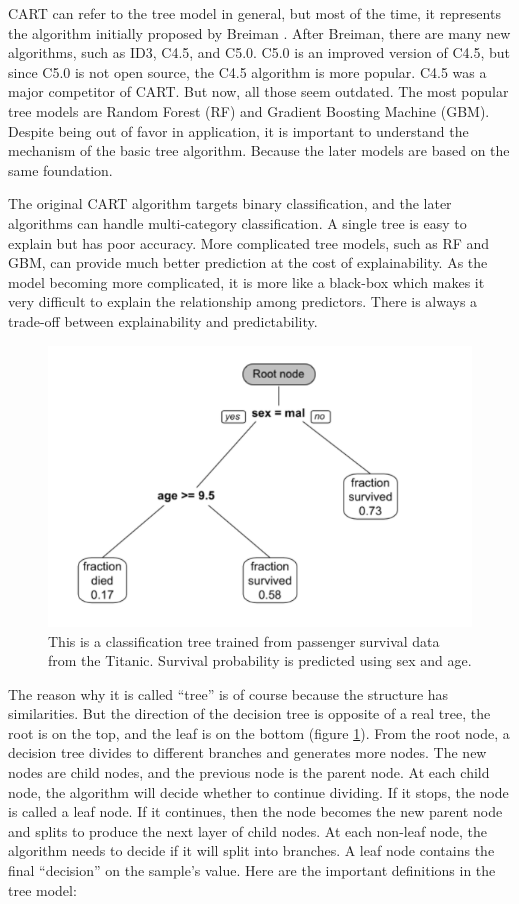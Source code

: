 \documentclass[12pt,]{krantz}
\begin{document}
CART can refer to the tree model in general, but most of the time, it represents the algorithm initially proposed by Breiman \citep{Breiman1984}. After Breiman, there are many new algorithms, such as ID3, C4.5, and C5.0. C5.0 is an improved version of C4.5, but since C5.0 is not open source, the C4.5 algorithm is more popular. C4.5 was a major competitor of CART. But now, all those seem outdated. The most popular tree models are Random Forest (RF) and Gradient Boosting Machine (GBM). Despite being out of favor in application, it is important to understand the mechanism of the basic tree algorithm. Because the later models are based on the same foundation.

The original CART algorithm targets binary classification, and the later algorithms can handle multi-category classification. A single tree is easy to explain but has poor accuracy. More complicated tree models, such as RF and GBM, can provide much better prediction at the cost of explainability. As the model becoming more complicated, it is more like a black-box which makes it very difficult to explain the relationship among predictors. There is always a trade-off between explainability and predictability.

\begin{figure}

{\centering \includegraphics[width=0.8\linewidth]{images/treeEN} 

}

\caption{This is a classification tree trained from passenger survival data from the Titanic.  Survival probability is predicted using sex and age.}\label{fig:treeexample}
\end{figure}

The reason why it is called ``tree'' is of course because the structure has similarities. But the direction of the decision tree is opposite of a real tree, the root is on the top, and the leaf is on the bottom (figure \ref{fig:treeexample}). From the root node, a decision tree divides to different branches and generates more nodes. The new nodes are child nodes, and the previous node is the parent node. At each child node, the algorithm will decide whether to continue dividing. If it stops, the node is called a leaf node. If it continues, then the node becomes the new parent node and splits to produce the next layer of child nodes. At each non-leaf node, the algorithm needs to decide if it will split into branches. A leaf node contains the final ``decision'' on the sample's value. Here are the important definitions in the tree model:
\end{document}
